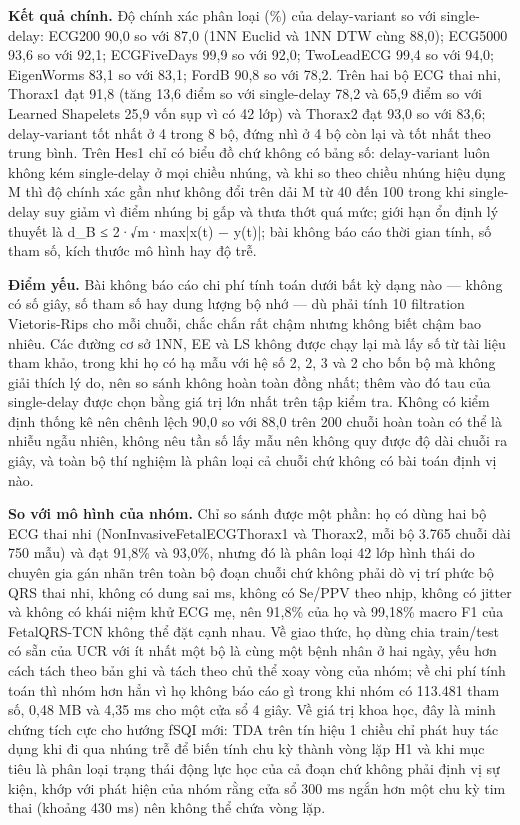 \documentclass[12pt,a4paper]{article}
\begin{document}
\noindent \textbf{Kết quả chính.} Độ chính xác phân loại (\%) của delay-variant so với single-delay: ECG200 90,0 so với 87,0 (1NN Euclid và 1NN DTW cùng 88,0); ECG5000 93,6 so với 92,1; ECGFiveDays 99,9 so với 92,0; TwoLeadECG 99,4 so với 94,0; EigenWorms 83,1 so với 83,1; FordB 90,8 so với 78,2. Trên hai bộ ECG thai nhi, Thorax1 đạt 91,8 (tăng 13,6 điểm so với single-delay 78,2 và 65,9 điểm so với Learned Shapelets 25,9 vốn sụp vì có 42 lớp) và Thorax2 đạt 93,0 so với 83,6; delay-variant tốt nhất ở 4 trong 8 bộ, đứng nhì ở 4 bộ còn lại và tốt nhất theo trung bình. Trên Hes1 chỉ có biểu đồ chứ không có bảng số: delay-variant luôn không kém single-delay ở mọi chiều nhúng, và khi so theo chiều nhúng hiệu dụng M thì độ chính xác gần như không đổi trên dải M từ 40 đến 100 trong khi single-delay suy giảm vì điểm nhúng bị gấp và thưa thớt quá mức; giới hạn ổn định lý thuyết là d\_B ≤ 2·√m·max|x(t) − y(t)|; bài không báo cáo thời gian tính, số tham số, kích thước mô hình hay độ trễ.\par\vspace{3pt}
\noindent \textbf{Điểm yếu.} Bài không báo cáo chi phí tính toán dưới bất kỳ dạng nào — không có số giây, số tham số hay dung lượng bộ nhớ — dù phải tính 10 filtration Vietoris-Rips cho mỗi chuỗi, chắc chắn rất chậm nhưng không biết chậm bao nhiêu. Các đường cơ sở 1NN, EE và LS không được chạy lại mà lấy số từ tài liệu tham khảo, trong khi họ có hạ mẫu với hệ số 2, 2, 3 và 2 cho bốn bộ mà không giải thích lý do, nên so sánh không hoàn toàn đồng nhất; thêm vào đó tau của single-delay được chọn bằng giá trị lớn nhất trên tập kiểm tra. Không có kiểm định thống kê nên chênh lệch 90,0 so với 88,0 trên 200 chuỗi hoàn toàn có thể là nhiễu ngẫu nhiên, không nêu tần số lấy mẫu nên không quy được độ dài chuỗi ra giây, và toàn bộ thí nghiệm là phân loại cả chuỗi chứ không có bài toán định vị nào.\par\vspace{3pt}
\noindent \textbf{\color{tdtblue}So với mô hình của nhóm.} Chỉ so sánh được một phần: họ có dùng hai bộ ECG thai nhi (NonInvasiveFetalECGThorax1 và Thorax2, mỗi bộ 3.765 chuỗi dài 750 mẫu) và đạt 91,8\% và 93,0\%, nhưng đó là phân loại 42 lớp hình thái do chuyên gia gán nhãn trên toàn bộ đoạn chuỗi chứ không phải dò vị trí phức bộ QRS thai nhi, không có dung sai ms, không có Se/PPV theo nhịp, không có jitter và không có khái niệm khử ECG mẹ, nên 91,8\% của họ và 99,18\% macro F1 của FetalQRS-TCN không thể đặt cạnh nhau. Về giao thức, họ dùng chia train/test có sẵn của UCR với ít nhất một bộ là cùng một bệnh nhân ở hai ngày, yếu hơn cách tách theo bản ghi và tách theo chủ thể xoay vòng của nhóm; về chi phí tính toán thì nhóm hơn hẳn vì họ không báo cáo gì trong khi nhóm có 113.481 tham số, 0,48 MB và 4,35 ms cho một cửa sổ 4 giây. Về giá trị khoa học, đây là minh chứng tích cực cho hướng fSQI mới: TDA trên tín hiệu 1 chiều chỉ phát huy tác dụng khi đi qua nhúng trễ để biến tính chu kỳ thành vòng lặp H1 và khi mục tiêu là phân loại trạng thái động lực học của cả đoạn chứ không phải định vị sự kiện, khớp với phát hiện của nhóm rằng cửa sổ 300 ms ngắn hơn một chu kỳ tim thai (khoảng 430 ms) nên không thể chứa vòng lặp.\par\vspace{3pt}
\end{document}
